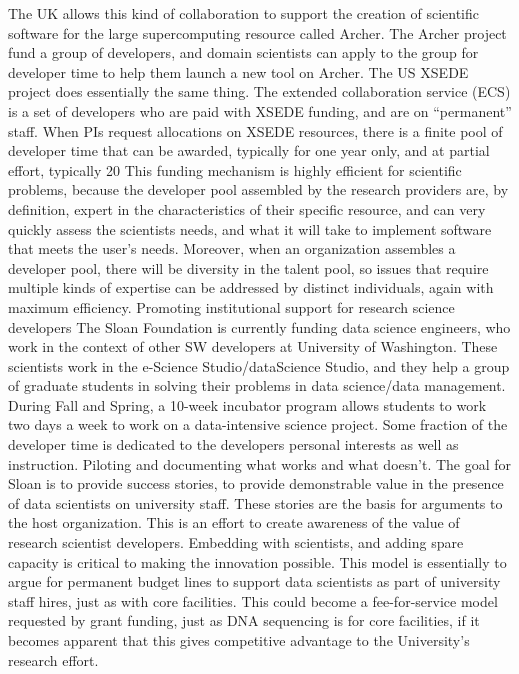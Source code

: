 The UK allows this kind of collaboration to support the creation of scientific software for the large supercomputing resource called Archer. The Archer project fund a group of developers, and domain scientists can apply to the group for developer time to help them launch a new tool on Archer.
The US XSEDE project does essentially the same thing. The extended collaboration service (ECS) is a set of developers who are paid with XSEDE funding, and are on “permanent” staff.  When PIs request allocations on XSEDE resources, there is a finite pool of developer time that can be awarded, typically for one year only, and at partial effort, typically 20%
This funding mechanism is highly efficient for scientific problems, because the developer pool assembled by the research providers are, by definition, expert in the characteristics of their specific resource, and can very quickly assess the scientists needs, and what it will take to implement software that meets the user’s needs. Moreover, when an organization assembles a developer pool, there will be diversity in the talent pool, so issues that require multiple kinds of expertise can be addressed by distinct individuals, again with maximum efficiency.
Promoting institutional support for research science developers
The Sloan Foundation is currently funding data science engineers, who work in the context of other SW developers at University of Washington.  These scientists work in the e-Science Studio/dataScience Studio, and they help a group of graduate students in solving their problems in data science/data management. During Fall and Spring, a 10-week incubator program allows students to work two days a week to work on a data-intensive science project. Some fraction of the developer time is dedicated to the developers personal interests as well as instruction. Piloting and documenting what works and what doesn’t.
The goal for Sloan is to provide success stories, to provide demonstrable value in the presence of data scientists on university staff. These stories are the basis for arguments to the host organization. This is an effort to create awareness of the value of research scientist developers. Embedding with scientists, and adding spare capacity is critical to making the innovation possible. This model is essentially to argue for permanent budget lines to support data scientists as part of university staff hires, just as with core facilities. This could become a fee-for-service model requested by grant funding, just as DNA sequencing is for core facilities, if it becomes apparent that this gives competitive advantage to the University’s research effort.
